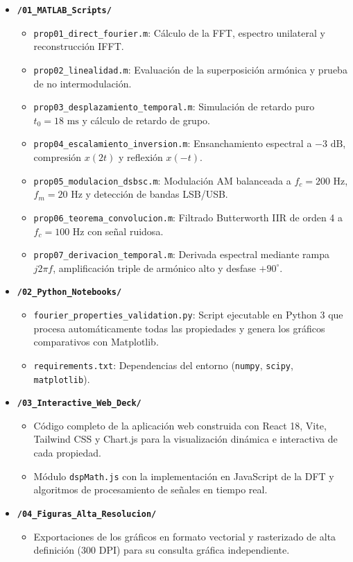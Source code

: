 \documentclass[11pt,a4paper]{article}
\begin{document}
\begin{itemize}
  \item \textbf{\texttt{/01\_MATLAB\_Scripts/}}
  \begin{itemize}[noitemsep]
    \item \texttt{prop01\_direct\_fourier.m}: C\'alculo de la FFT, espectro unilateral y reconstrucci\'on IFFT.
    \item \texttt{prop02\_linealidad.m}: Evaluaci\'on de la superposici\'on arm\'onica y prueba de no intermodulaci\'on.
    \item \texttt{prop03\_desplazamiento\_temporal.m}: Simulaci\'on de retardo puro $t_0 = 18\text{ ms}$ y c\'alculo de retardo de grupo.
    \item \texttt{prop04\_escalamiento\_inversion.m}: Ensanchamiento espectral a $-3\text{ dB}$, compresi\'on $x(2t)$ y reflexi\'on $x(-t)$.
    \item \texttt{prop05\_modulacion\_dsbsc.m}: Modulaci\'on AM balanceada a $f_c = 200\text{ Hz}$, $f_m = 20\text{ Hz}$ y detecci\'on de bandas LSB/USB.
    \item \texttt{prop06\_teorema\_convolucion.m}: Filtrado Butterworth IIR de orden 4 a $f_c = 100\text{ Hz}$ con se\~nal ruidosa.
    \item \texttt{prop07\_derivacion\_temporal.m}: Derivada espectral mediante rampa $j2\pi f$, amplificaci\'on triple de arm\'onico alto y desfase $+90^\circ$.
  \end{itemize}

  \item \textbf{\texttt{/02\_Python\_Notebooks/}}
  \begin{itemize}[noitemsep]
    \item \texttt{fourier\_properties\_validation.py}: Script ejecutable en Python 3 que procesa autom\'aticamente todas las propiedades y genera los gr\'aficos comparativos con Matplotlib.
    \item \texttt{requirements.txt}: Dependencias del entorno (\texttt{numpy}, \texttt{scipy}, \texttt{matplotlib}).
  \end{itemize}

  \item \textbf{\texttt{/03\_Interactive\_Web\_Deck/}}
  \begin{itemize}[noitemsep]
    \item C\'odigo completo de la aplicaci\'on web construida con React 18, Vite, Tailwind CSS y Chart.js para la visualizaci\'on din\'amica e interactiva de cada propiedad.
    \item M\'odulo \texttt{dspMath.js} con la implementaci\'on en JavaScript de la DFT y algoritmos de procesamiento de se\~nales en tiempo real.
  \end{itemize}

  \item \textbf{\texttt{/04\_Figuras\_Alta\_Resolucion/}}
  \begin{itemize}[noitemsep]
    \item Exportaciones de los gr\'aficos en formato vectorial y rasterizado de alta definici\'on (300 DPI) para su consulta gr\'afica independiente.
  \end{itemize}
\end{itemize}
\end{document}
